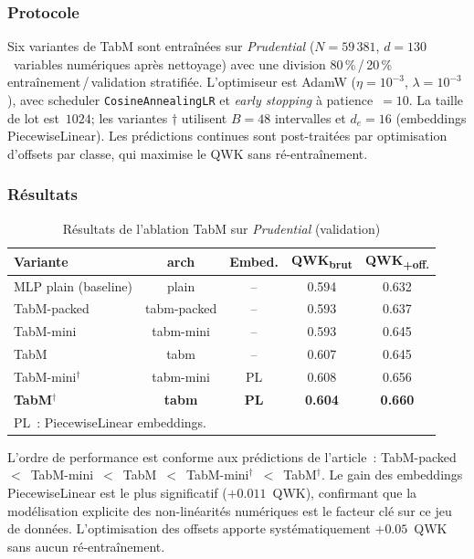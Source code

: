 \documentclass[conference]{IEEEtran}
\begin{document}
\subsubsection{Protocole}
Six variantes de TabM sont entraînées sur \textit{Prudential} ($N=59\,381$,
$d=130$~variables numériques après nettoyage) avec une division
80\,\%\,/\,20\,\% entraînement\,/\,validation stratifiée. L'optimiseur est
AdamW ($\eta=10^{-3}$, $\lambda=10^{-3}$), avec scheduler
\texttt{CosineAnnealingLR} et \textit{early stopping} à patience~$=10$.
La taille de lot est~$1024$; les variantes $\dagger$ utilisent $B=48$ intervalles
et $d_e=16$ (embeddings PiecewiseLinear). Les prédictions continues sont post-traitées
par optimisation d'offsets par classe, qui maximise le QWK sans ré-entraînement.

\subsubsection{Résultats}

\begin{table}[htbp]
\caption{Résultats de l'ablation TabM sur \textit{Prudential} (validation)}
\label{tab:ablation_tabm}
\centering
\begin{tabular}{lcccc}
\toprule
\textbf{Variante} & \textbf{arch} & \textbf{Embed.} &
\textbf{QWK\textsubscript{brut}} & \textbf{QWK\textsubscript{+off.}} \\
\midrule
MLP plain (baseline)    & plain      & --  & 0.594 & 0.632 \\
TabM-packed             & tabm-packed & --  & 0.593 & 0.637 \\
TabM-mini               & tabm-mini  & --  & 0.593 & 0.645 \\
TabM                    & tabm       & --  & 0.607 & 0.645 \\
TabM-mini$^\dagger$     & tabm-mini  & PL  & 0.608 & 0.656 \\
\textbf{TabM$^\dagger$} & \textbf{tabm} & \textbf{PL} &
\textbf{0.604} & \textbf{0.660} \\
\bottomrule
\multicolumn{5}{l}{\footnotesize PL~: PiecewiseLinear embeddings.}
\end{tabular}
\end{table}

L'ordre de performance est conforme aux prédictions de l'article~:
TabM-packed~$<$~TabM-mini~$<$~TabM~$<$~TabM-mini$^\dagger$~$<$~TabM$^\dagger$.
Le gain des embeddings PiecewiseLinear est le plus significatif ($+0.011$~QWK),
confirmant que la modélisation explicite des non-linéarités numériques est le
facteur clé sur ce jeu de données. L'optimisation des offsets apporte
systématiquement $+0.05$~QWK sans aucun ré-entraînement.
\end{document}

